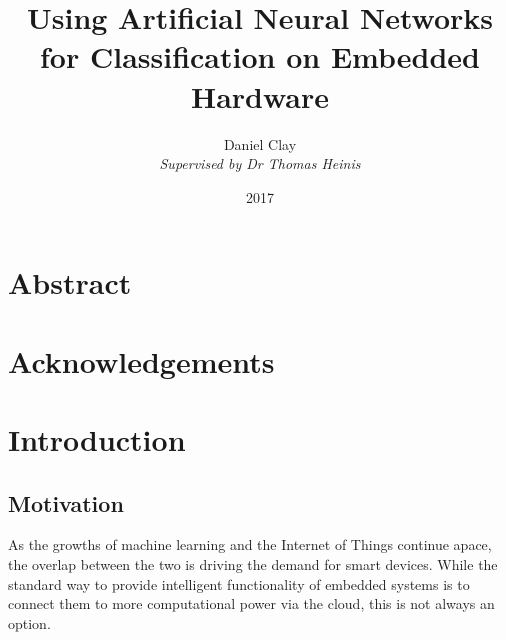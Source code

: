 \documentclass[a4paper]{article}
\begin{document}
\title{Using Artificial Neural Networks for Classification on Embedded Hardware}
\date{2017}
\author{
Daniel Clay\\
\emph{Supervised by Dr Thomas Heinis}\\ 
}
\maketitle
\pagebreak

\section{Abstract}


\section{Acknowledgements}



\pagebreak
\tableofcontents
\pagebreak


\newpage
\section{Introduction}

\subsection{Motivation}%

As the growths of machine learning and the Internet of Things continue apace, the overlap between the two is driving the demand for smart devices. While the standard way to provide intelligent functionality of embedded systems is to connect them to more computational power via the cloud, this is not always an option.
\end{document}
